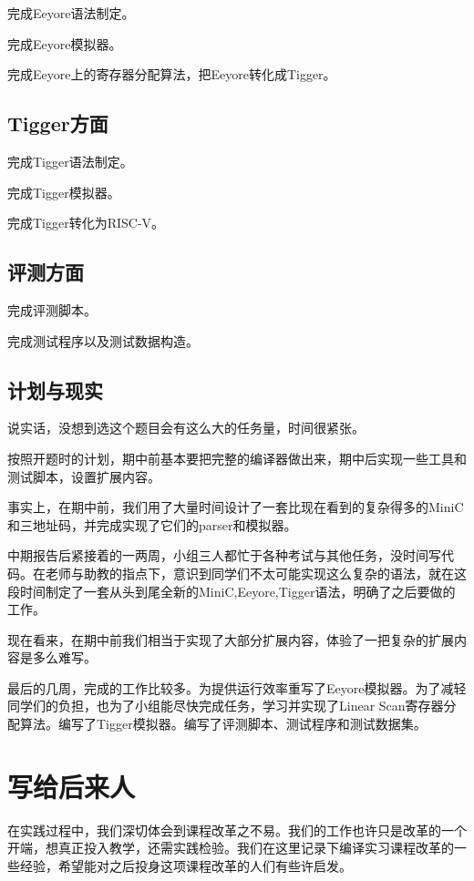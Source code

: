 \documentclass[a4paper]{ctexart}
\begin{document}
完成Eeyore语法制定。

完成Eeyore模拟器。

完成Eeyore上的寄存器分配算法，把Eeyore转化成Tigger。

\subsection{Tigger方面}

完成Tigger语法制定。

完成Tigger模拟器。

完成Tigger转化为RISC-V。

\subsection{评测方面}

完成评测脚本。

完成测试程序以及测试数据构造。

\subsection{计划与现实}

说实话，没想到选这个题目会有这么大的任务量，时间很紧张。

按照开题时的计划，期中前基本要把完整的编译器做出来，期中后实现一些工具和测试脚本，设置扩展内容。

事实上，在期中前，我们用了大量时间设计了一套比现在看到的复杂得多的MiniC和三地址码，并完成实现了它们的parser和模拟器。

中期报告后紧接着的一两周，小组三人都忙于各种考试与其他任务，没时间写代码。在老师与助教的指点下，意识到同学们不太可能实现这么复杂的语法，就在这段时间制定了一套从头到尾全新的MiniC,Eeyore,Tigger语法，明确了之后要做的工作。

现在看来，在期中前我们相当于实现了大部分扩展内容，体验了一把复杂的扩展内容是多么难写。

最后的几周，完成的工作比较多。为提供运行效率重写了Eeyore模拟器。为了减轻同学们的负担，也为了小组能尽快完成任务，学习并实现了Linear Scan寄存器分配算法。编写了Tigger模拟器。编写了评测脚本、测试程序和测试数据集。

\newpage
\section{写给后来人}

在实践过程中，我们深切体会到课程改革之不易。我们的工作也许只是改革的一个开端，想真正投入教学，还需实践检验。我们在这里记录下编译实习课程改革的一些经验，希望能对之后投身这项课程改革的人们有些许启发。
\end{document}
